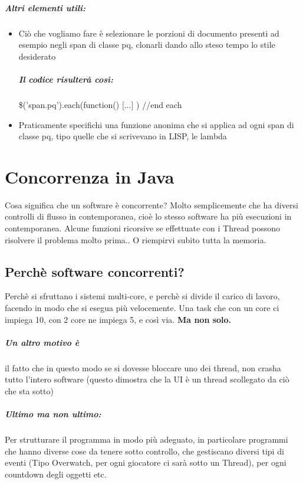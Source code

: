 \documentclass[12pt, a4paper, openany, twoside]{book}
\begin{document}
\paragraph{Altri elementi utili:}
\begin{itemize}
	\item Ciò che vogliamo fare è selezionare le porzioni di documento presenti 
	ad esempio negli span di classe pq, clonarli dando allo steso tempo lo stile desiderato
	\paragraph{Il codice risulterà così:}
	\$('span.pq').each(function(){
	[...]
	}) //end each
	\item Praticamente specifichi una funzione anonima che si applica ad ogni span
	di classe pq, tipo quelle che si scrivevano in LISP, le lambda
\end{itemize}
\chapter{Concorrenza in Java}
Cosa significa che un software è concorrente? Molto semplicemente che ha diversi
controlli di flusso in contemporanea, cioè lo stesso software ha più esecuzioni
in contemporanea. Alcune funzioni ricorsive se effettuate con i Thread possono
risolvere il problema molto prima.. O riempirvi subito tutta la memoria.
\section{Perchè software concorrenti?}
Perchè si sfruttano i sistemi multi-core, e perchè si divide il carico di lavoro,
facendo in modo che si esegua più velocemente. Una task che con un core ci 
impiega 10, con 2 core ne impiega 5, e così via. \textbf{Ma non solo.}
\paragraph{Un altro motivo è} il fatto che in questo modo se si dovesse bloccare
uno dei thread, non crasha tutto l'intero software (questo dimostra che la UI è
un thread scollegato da ciò che sta sotto)
\paragraph{Ultimo ma non ultimo:} Per strutturare il programma in modo più adeguato,
in particolare programmi che hanno diverse cose da tenere sotto controllo, che gestiscano
diversi tipi di eventi (Tipo Overwatch, per ogni giocatore ci sarà sotto un Thread),
per ogni countdown degli oggetti etc.
\end{document}
